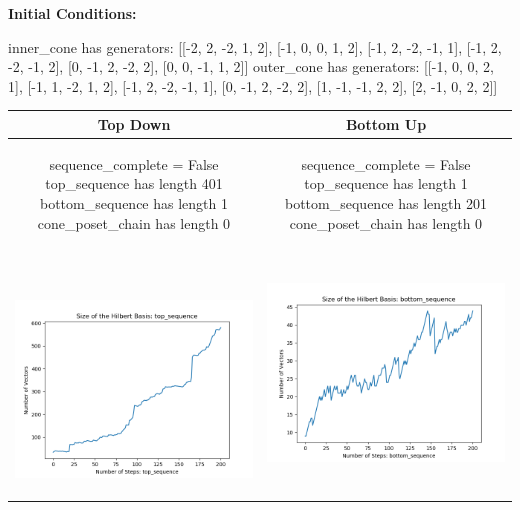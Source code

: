\documentclass[10pt]{article}
\begin{document}
\textbf{Initial Conditions:}
\begin{SAGE}
inner_cone has generators: 
[[-2, 2, -2, 1, 2], [-1, 0, 0, 1, 2], [-1, 2, -2, -1, 1], [-1, 2, -2, -1, 2], [0, -1, 2, -2, 2], [0, 0, -1, 1, 2]]
outer_cone has generators: 
[[-1, 0, 0, 2, 1], [-1, 1, -2, 1, 2], [-1, 2, -2, -1, 1], [0, -1, 2, -2, 2], [1, -1, -1, 2, 2], [2, -1, 0, 2, 2]]

\end{SAGE}
\begin{tabular}{c|c}
\textbf{Top Down} & \textbf{Bottom Up} \\ \hline  
\begin{SAGE}
	sequence_complete = False
	top_sequence has length 401
	bottom_sequence has length 1
	cone_poset_chain has length 0
\end{SAGE} 
&
\begin{SAGE}
	sequence_complete = False
	top_sequence has length 1
	bottom_sequence has length 201
	cone_poset_chain has length 0
\end{SAGE} 
\\ \hline
\
\begin{minipage}{.45\textwidth}
\includegraphics[width=\textwidth]{"DATA/5d/6 generators 2 bound G/top_sequence SIZE"}
\end{minipage} &
\begin{minipage}{.45\textwidth}
\includegraphics[width=\textwidth]{"DATA/5d/6 generators 2 bound G bottomup/bottom_sequence SIZE"}

\end{minipage}
\end{tabular}
\end{document}
